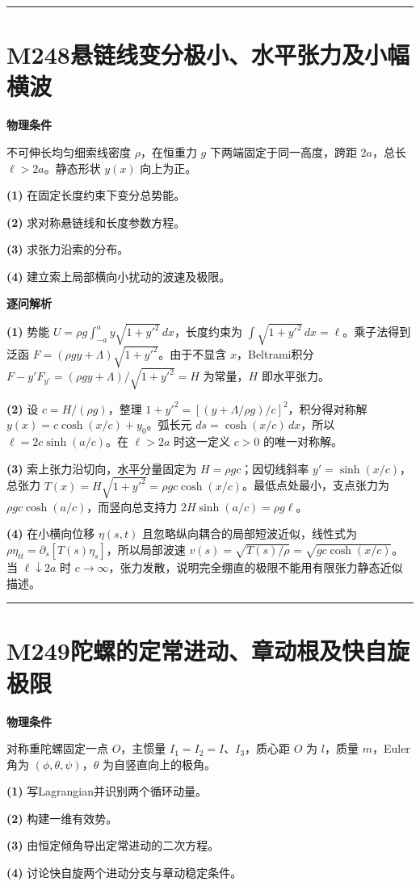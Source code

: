 \documentclass[UTF8,a4paper,11pt,oneside,openany]{ctexbook}
\begin{document}
\par\bigskip\hrule\bigskip
\section*{M248\quad 悬链线变分极小、水平张力及小幅横波}
\textbf{物理条件}\par 不可伸长均匀细索线密度 \(\rho\)，在恒重力 \(g\) 下两端固定于同一高度，跨距 \(2a\)，总长 \(\ell>2a\)。静态形状 \(y(x)\) 向上为正。
\par\noindent\textbf{(1)} 在固定长度约束下变分总势能。
\par\noindent\textbf{(2)} 求对称悬链线和长度参数方程。
\par\noindent\textbf{(3)} 求张力沿索的分布。
\par\noindent\textbf{(4)} 建立索上局部横向小扰动的波速及极限。

\par\medskip\noindent\textbf{逐问解析}
\par\noindent\textbf{(1)} 势能 \(U=\rho g\int_{-a}^{a} y\sqrt{1+y'^2}\,dx\)，长度约束为 \(\int\sqrt{1+y'^2}\,dx=\ell\)。乘子法得到泛函 \(F=(\rho gy+\Lambda)\sqrt{1+y'^2}\)。由于不显含 \(x\)，Beltrami积分 \(F-y'F_{y'}=(\rho gy+\Lambda)/\sqrt{1+y'^2}=H\) 为常量，\(H\) 即水平张力。
\par\noindent\textbf{(2)} 设 \(c=H/(\rho g)\)，整理 \(1+y'^2=[(y+\Lambda/\rho g)/c]^2\)，积分得对称解 \(y(x)=c\cosh(x/c)+y_0\)。弧长元 \(ds=\cosh(x/c)\,dx\)，所以 \(\ell=2c\sinh(a/c)\)。在 \(\ell>2a\) 时这一定义 \(c>0\) 的唯一对称解。
\par\noindent\textbf{(3)} 索上张力沿切向，水平分量固定为 \(H=\rho gc\)；因切线斜率 \(y'=\sinh(x/c)\)，总张力 \(T(x)=H\sqrt{1+y'^2}=\rho gc\cosh(x/c)\)。最低点处最小，支点张力为 \(\rho gc\cosh(a/c)\)，而竖向总支持力 \(2H\sinh(a/c)=\rho g\ell\)。
\par\noindent\textbf{(4)} 在小横向位移 \(\eta(s,t)\) 且忽略纵向耦合的局部短波近似，线性式为 \(\rho\eta_{tt}=\partial_s[T(s)\eta_s]\)，所以局部波速 \(v(s)=\sqrt{T(s)/\rho}=\sqrt{gc\cosh(x/c)}\)。当 \(\ell\downarrow2a\) 时 \(c\to\infty\)，张力发散，说明完全绷直的极限不能用有限张力静态近似描述。

\par\bigskip\hrule\bigskip
\section*{M249\quad 陀螺的定常进动、章动根及快自旋极限}
\textbf{物理条件}\par 对称重陀螺固定一点 \(O\)，主惯量 \(I_1=I_2=I\)、\(I_3\)，质心距 \(O\) 为 \(l\)，质量 \(m\)，Euler角为 \((\phi,\theta,\psi)\)，\(\theta\) 为自竖直向上的极角。
\par\noindent\textbf{(1)} 写Lagrangian并识别两个循环动量。
\par\noindent\textbf{(2)} 构建一维有效势。
\par\noindent\textbf{(3)} 由恒定倾角导出定常进动的二次方程。
\par\noindent\textbf{(4)} 讨论快自旋两个进动分支与章动稳定条件。
\end{document}
